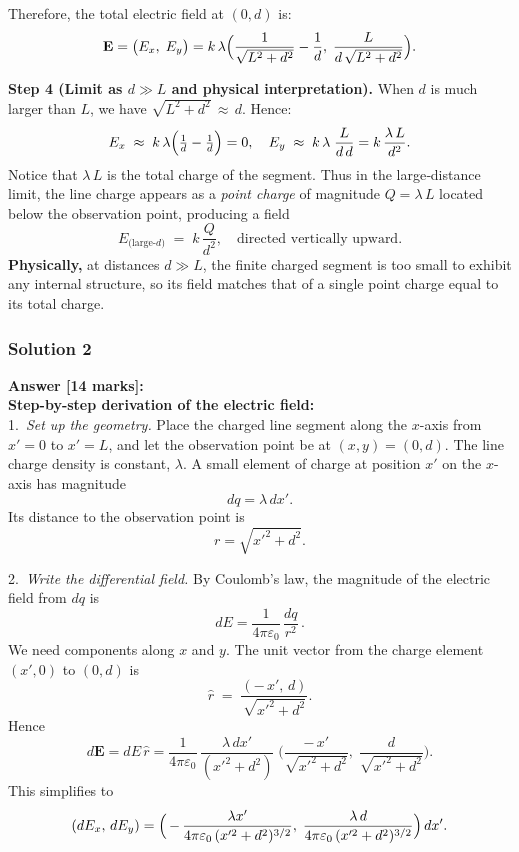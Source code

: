 \documentclass{article}
\begin{document}
\noindent
Therefore, the total electric field at $(0,d)$ is:
\[
  \mathbf{E}
  =
  \bigl(E_x,\;E_y\bigr)
  =
  k\,\lambda
  \Bigl(
    \frac{1}{\sqrt{L^2 + d^2}} - \frac{1}{d},
    \;\frac{L}{d\,\sqrt{L^2 + d^2}}
  \Bigr).
\]

\bigskip
\noindent
\textbf{Step 4 (Limit as $d \gg L$ and physical interpretation).}
When $d$ is much larger than $L$, we have $\sqrt{L^2 + d^2}\,\approx\,d$.  
Hence:
\[
  E_x
  \;\approx\;
  k\,\lambda
  \Bigl(
    \tfrac{1}{d} - \tfrac{1}{d}
  \Bigr)
  = 0,
  \quad
  E_y
  \;\approx\;
  k\,\lambda\;\frac{L}{d\,d}
  =
  k\,\frac{\lambda\,L}{d^2}.
\]
Notice that $\lambda\,L$ is the total charge of the segment.  
Thus in the large‐distance limit, the line charge appears as a \emph{point charge} 
of magnitude $Q=\lambda\,L$ located below the observation point, producing a field
\[
  E_{\text{(large-$d$)}}
  \;=\;
  k\,\frac{Q}{d^2},
  \quad
  \text{directed vertically upward.}
\]
\textbf{Physically,} at distances $d \gg L$, the finite charged segment is too small 
to exhibit any internal structure, so its field matches that of a single point charge 
equal to its total charge.


\subsubsection{Solution 2}

\noindent
\textbf{Answer [14 marks]:}\\[6pt]
\noindent
\textbf{Step-by-step derivation of the electric field:}\\[2pt]

1.\ 
\textit{Set up the geometry.} 
Place the charged line segment along the $x$-axis from $x'=0$ to $x'=L$, and let the observation point be at $(x,y)=(0,d)$. 
The line charge density is constant, $\lambda$. 
A small element of charge at position $x'$ on the $x$-axis has magnitude
\[
dq = \lambda\,dx'.
\]
Its distance to the observation point is 
\[
r = \sqrt{x'^2 + d^2}.
\]
   
2.\ 
\textit{Write the differential field.}
By Coulomb's law, the magnitude of the electric field from $dq$ is
\[
dE = \frac{1}{4\pi\varepsilon_0}\,\frac{dq}{r^2}\,.
\]
We need components along $x$ and $y$. The unit vector from the charge element $(x',0)$ to $(0,d)$ is
\[
\hat{r} \;=\; \frac{(-\,x',\,d)}{\sqrt{x'^2 + d^2}}.
\]
Hence
\[
d\mathbf{E} 
= dE\,\hat{r} 
= \frac{1}{4\pi\varepsilon_0}\,\frac{\lambda\,dx'}{(x'^2 + d^2)} \;
\biggl(\frac{-\,x'}{\sqrt{x'^2 + d^2}},\;\frac{d}{\sqrt{x'^2 + d^2}}\biggr).
\]
This simplifies to 
\[
(dE_x,\,dE_y)
= \Bigl(\,-\,\frac{\lambda x'}{4\pi\varepsilon_0\,(x'^2 + d^2)^{3/2}},\;
\frac{\lambda\,d}{4\pi\varepsilon_0\,(x'^2 + d^2)^{3/2}}\Bigr)\,dx'.
\]
\end{document}
